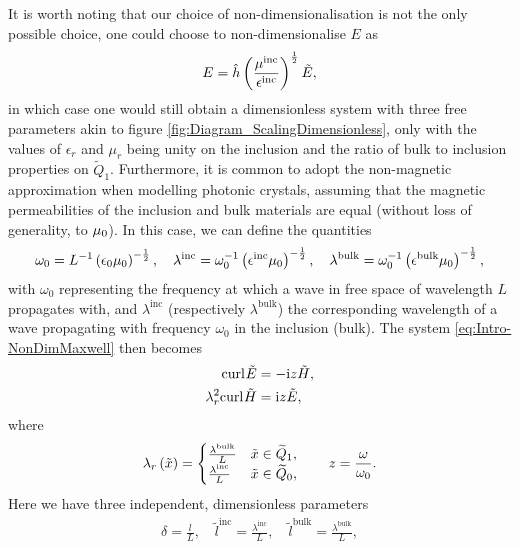 It is worth noting that our choice of non-dimensionalisation is not the only possible choice, one could choose to non-dimensionalise $E$ as
\begin{align*}
	E = \hat{h}\left( \frac{\mu^{\mathrm{inc}}}{\epsilon^{\mathrm{inc}}} \right)^{\frac{1}{2}}\tilde{E},
\end{align*}
in which case one would still obtain a dimensionless system with three free parameters akin to figure \ref{fig:Diagram_ScalingDimensionless}, only with the values of $\epsilon_r$ and $\mu_r$ being unity on the inclusion and the ratio of bulk to inclusion properties on $\tilde{Q}_1$.
Furthermore, it is common to adopt the non-magnetic approximation when modelling photonic crystals, assuming that the magnetic permeabilities of the inclusion and bulk materials are equal (without loss of generality, to $\mu_0$).
In this case, we can define the quantities
\begin{align*}
	\omega_0 = L^{-1}\left( \epsilon_0\mu_0 \right)^{-\frac{1}{2}}, \quad
	\lambda^{\mathrm{inc}} = \omega_0^{-1}\left( \epsilon^{\mathrm{inc}}\mu_0 \right)^{-\frac{1}{2}}, \quad
	\lambda^{\mathrm{bulk}} = \omega_0^{-1}\left( \epsilon^{\mathrm{bulk}}\mu_0 \right)^{-\frac{1}{2}},
\end{align*}
with $\omega_0$ representing the frequency at which a wave in free space of wavelength $L$ propagates with, and $\lambda^{\mathrm{inc}}$ (respectively $\lambda^{\mathrm{bulk}}$) the corresponding wavelength of a wave propagating with frequency $\omega_0$ in the inclusion (bulk).
The system \eqref{eq:Intro-NonDimMaxwell} then becomes
\begin{subequations} \label{eq:Intro-NonDimMaxwellLengths}
	\begin{align}
		\mathrm{curl}_{}\tilde{E} &= -\mathrm{i} z\tilde{H}, \\
		\lambda_{r}^2\mathrm{curl}_{}\tilde{H} &= \mathrm{i} z\tilde{E},
	\end{align}
\end{subequations}
where
\begin{align*}
	\lambda_r\left( \tilde{x} \right) = 
	\begin{cases} 
		\frac{\lambda^{\mathrm{bulk}}}{L} & \tilde{x}\in\widetilde{Q}_1, \\ 
		\frac{\lambda^{\mathrm{inc}}}{L} & \tilde{x}\in\widetilde{Q}_0,
	\end{cases}
	\qquad
	z = \frac{\omega}{\omega_0}.
\end{align*}
Here we have three independent, dimensionless parameters
\begin{align*}
	\delta = \frac{l}{L}, \quad
	\tilde{l}^{\mathrm{inc}} = \frac{\lambda^{\mathrm{inc}}}{L}, \quad
	\tilde{l}^{\mathrm{bulk}} = \frac{\lambda^{\mathrm{bulk}}}{L},
\end{align*}
